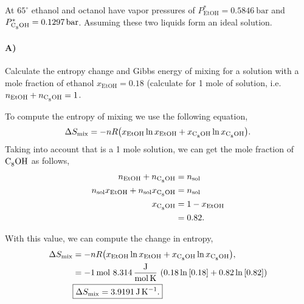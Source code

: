 \documentclass[main.tex]{subfiles}
\begin{document}

At $65^\circ$\SI{}{\celcius} ethanol and octanol have vapor pressures of $P^*_{\mathrm{EtOH}} = \SI{0.5846}{\bar}$ and $P^*_{\ce{C8OH}} = \SI{0.1297}{\bar}$.
Assuming these two liquids form an ideal solution.

\paragraph{A)} Calculate the entropy change and Gibbs energy of mixing for a solution with a mole fraction of ethanol $x_{\mathrm{EtOH}}=0.18$ (calculate for 1 mole of solution, i.e. $ n_{\mathrm{EtOH}} + n_{\ce{C8OH}} =1 $.

To compute the entropy of mixing we use the following equation,
\begin{gather*}
    \Delta S_{\mathrm{mix}} = -n R\qty(x_{\mathrm{EtOH}}\ln x_{\mathrm{EtOH}} + x_{\ce{C8OH}}\ln x_{\ce{C8OH}} ). 
\end{gather*}
Taking into account that is a 1 mole solution, we can get the mole fraction of $\ce{C8OH}$ as follows,
\begin{align*}
    n_{\mathrm{EtOH}} + n_{\ce{C8OH}} &= n_{\mathrm{sol}} \\
    n_{\mathrm{sol}} x_{\mathrm{EtOH}} + n_{\mathrm{sol}} x_{\ce{C8OH}} &= n_{\mathrm{sol}} \\
    x_{\ce{C8OH}} &= 1 - x_{\mathrm{EtOH}} \\
    &= 0.82.
\end{align*}

With this value, we can compute the change in entropy,
\begin{align*}
    \Delta S_{\mathrm{mix}} &= -n R\qty(x_{\mathrm{EtOH}}\ln x_{\mathrm{EtOH}} + x_{\ce{C8OH}}\ln x_{\ce{C8OH}} ), \\
    &= -\SI{1}{\mole}~\SI[per-mode=fraction]{8.314}{\joule\per\mole\per\kelvin}~\qty(0.18\ln\qty[0.18] + 0.82\ln\qty[0.82]) \\
    & \boxed{\Delta S_{\mathrm{mix}} = \SI{3.9191}{\joule\per\kelvin}.}
\end{align*}
\end{document}
